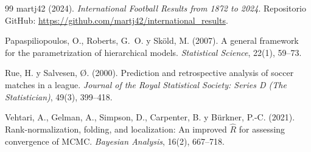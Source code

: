 \documentclass[12pt,a4paper]{article}
\begin{document}
\begin{thebibliography}{99}
martj42 (2024).
\newblock \textit{International Football Results from 1872 to 2024}.
\newblock Repositorio GitHub: \url{https://github.com/martj42/international_results}.

Papaspiliopoulos, O., Roberts, G.~O. y Sköld, M. (2007).
\newblock A general framework for the parametrization of hierarchical models.
\newblock \textit{Statistical Science}, 22(1), 59--73.

Rue, H. y Salvesen, Ø. (2000).
\newblock Prediction and retrospective analysis of soccer matches in a league.
\newblock \textit{Journal of the Royal Statistical Society: Series D (The
  Statistician)}, 49(3), 399--418.

Vehtari, A., Gelman, A., Simpson, D., Carpenter, B. y Bürkner, P.-C. (2021).
\newblock Rank-normalization, folding, and localization: An improved $\hat{R}$
  for assessing convergence of {MCMC}.
\newblock \textit{Bayesian Analysis}, 16(2), 667--718.

\end{thebibliography}
\end{document}
